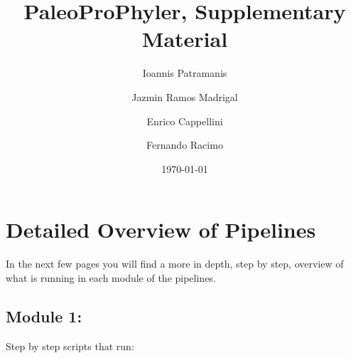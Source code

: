 \documentclass{book}
\begin{document}
\title{PaleoProPhyler, Supplementary Material}
\author[1]{Ioannis Patramanis}
\author[3]{Jazmin Ramos Madrigal}
\author[2]{Enrico Cappellini}
\author[1,2]{Fernando Racimo}



\date{\today}
\maketitle



















\section{\huge Detailed Overview of Pipelines}
In the next few pages you will find a more in depth, step by step, overview of what is running in each module of the pipelines.

\vspace{1cm}

\subsection{\huge Module 1:}
Step by step scripts that run:
\end{document}
